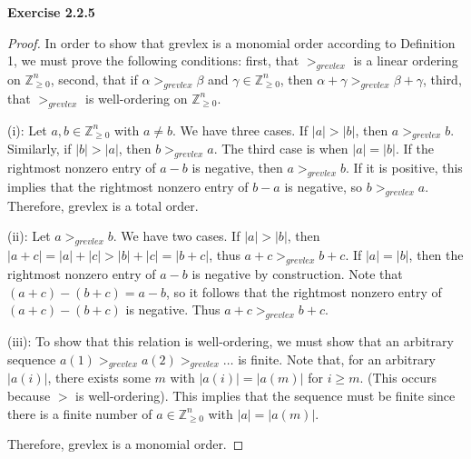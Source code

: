\documentclass[12pt,oneside]{article}
\newenvironment{exercise}[1]{\vspace{.1in}\noindent\textbf{Exercise #1 \hspace{.05em}}}{}
\newcommand{\Z}{\mathbb{Z}}
\begin{document}
\begin{exercise}{2.2.5}
    \begin{proof}
        In order to show that grevlex is a monomial order according to Definition
        1, we must prove the following conditions: first, that $>_{grevlex}$ is a 
        linear ordering on $\Z_{\geq 0}^n$, second, that if $\alpha >_{grevlex} \beta$ and 
        $\gamma \in \Z_{\geq 0}^n$, then $\alpha + \gamma >_{grevlex} \beta + \gamma$, third, 
        that $>_{grevlex}$ is well-ordering on $\Z_{\geq 0}^n$.

        (i): Let $a,b \in \Z_{\geq 0}^n$ with $a \neq b$. We have three cases. 
        If $|a|>|b|$, then $a>_{grevlex}b$. Similarly, if $|b|>|a|$, then 
        $b>_{grevlex}a$. The third case is when $|a|=|b|$. If the rightmost 
        nonzero entry of $a-b$ is negative, then $a>_{grevlex}b$. If it is 
        positive, this implies that the rightmost nonzero entry of $b-a$ is 
        negative, so $b>_{grevlex}a$. Therefore, grevlex is a total order. 

        (ii): Let $a>_{grevlex}b$. We have two cases. If $|a|>|b|$, then 
        $|a+c|=|a|+|c|>|b|+|c|=|b+c|$, thus $a+c>_{grevlex}b+c$. If $|a|=|b|$, 
        then the rightmost nonzero entry of $a-b$ is negative by construction. 
        Note that $(a+c)-(b+c)=a-b$, so it follows that the rightmost nonzero 
        entry of $(a+c)-(b+c)$ is negative. Thus $a+c>_{grevlex}b+c$.

        (iii): To show that this relation is well-ordering, we must show that 
        an arbitrary sequence $a(1) >_{grevlex} a(2) >_{grevlex} \ldots$ is finite.
        Note that, for an arbitrary $|a(i)|$, there exists some $m$ with 
        $|a(i)|=|a(m)|$ for $i\geq m$. (This occurs because $>$ is well-ordering).
        This implies that the sequence must be finite since there is a finite number 
        of $a \in \Z_{\geq 0}^n$ with $|a| = |a(m)|$.

        Therefore, grevlex is a monomial order.
    \end{proof}
\end{exercise}

\end{document}
